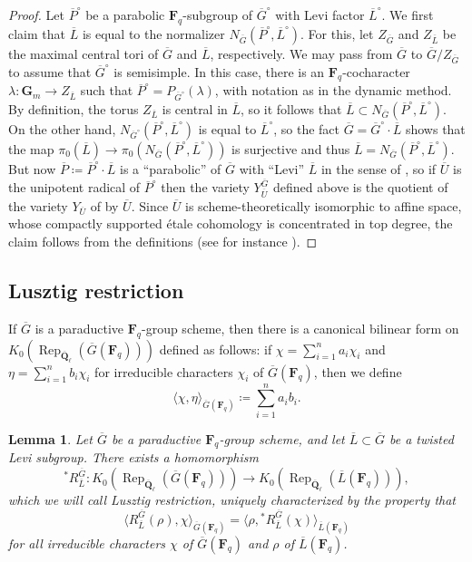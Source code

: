 \documentclass[reqno]{amsart}
\numberwithin{equation}{subsection}
\newcommand{\F}{\mathbf{F}}
\newcommand{\G}{\mathbf{G}}
\newcommand{\Q}{\mathbf{Q}}
\newcommand{\ol}[1]{\overline{#1}}
\newcommand{\co}{\colon}
\DeclareMathOperator{\Rep}{Rep}
\newtheorem{lemma}[thm]{Lemma}
\theoremstyle{remark}
\numberwithin{equation}{subsection}
\numberwithin{figure}{subsection}
\begin{document}
\begin{proof}
    Let $\ol P^\circ$ be a parabolic $\F_q$-subgroup of $\ol G^\circ$ with Levi factor $\ol L^\circ$. We first claim that $\ol L$ is equal to the normalizer $N_{\ol G}(\ol P^\circ, \ol L^\circ)$. For this, let $Z_{\ol G}$ and $Z_{\ol L}$ be the maximal central tori of $\ol G$ and $\ol L$, respectively. We may pass from $\ol G$ to $\ol G/Z_{\ol G}$ to assume that $\ol G^\circ$ is semisimple. In this case, there is an $\F_q$-cocharacter $\lambda\co \G_m \to Z_{\ol L}$ such that $\ol P^\circ = P_{\ol G^\circ}(\lambda)$, with notation as in the dynamic method. By definition, the torus $Z_{\ol L}$ is central in $\ol L$, so it follows that $\ol L \subset N_{\ol G}(\ol P^\circ, \ol L^\circ)$. On the other hand, $N_{\ol G^\circ}(\ol P^\circ, \ol L^\circ)$ is equal to $\ol L^\circ$, so the fact $\ol G = \ol G^\circ \cdot \ol L$ shows that the map $\pi_0(\ol L) \to \pi_0(N_{\ol G}(\ol P^\circ, \ol L^\circ))$ is surjective and thus $\ol L = N_{\ol G}(\ol P^\circ, \ol L^\circ)$. But now $\ol P \coloneqq \ol P^\circ \cdot \ol L$ is a ``parabolic'' of $\ol G$ with ``Levi'' $\ol L$ in the sense of \cite[D\'efinition 1.4]{DM94}, so if $\ol U$ is the unipotent radical of $\ol P^\circ$ then the variety $Y_{\ol U}^{\ol G}$ defined above is the quotient of the variety $Y_{\ol U}$ of \cite[D\'efinition 2.1]{DM94} by $\ol U$. Since $\ol U$ is scheme-theoretically isomorphic to affine space, whose compactly supported \'etale cohomology is concentrated in top degree, the claim follows from the definitions (see for instance \cite[Proposition 10.12]{DM20}).
\end{proof}



\subsection{Lusztig restriction}\label{ss:lusztig-restriction}

If $\ol G$ is a paraductive $\F_q$-group scheme, then there is a canonical bilinear form on $K_0(\Rep_{\ol\Q_\ell}(\ol G(\F_q)))$ defined as follows: if $\chi = \sum_{i=1}^n a_i\chi_i$ and $\eta = \sum_{i=1}^n b_i \chi_i$ for irreducible characters $\chi_i$ of $\ol G(\F_q)$, then we define
\[
\langle \chi, \eta\rangle_{\ol G(\F_q)} \coloneqq \sum_{i=1}^n a_ib_i.
\]

\begin{lemma}\label{lemma:dl-restriction}
    Let $\ol G$ be a paraductive $\F_q$-group scheme, and let $\ol L \subset \ol G$ be a twisted Levi subgroup. There exists a homomorphism
    \[
    ^*R^{\ol G}_{\ol L}\co K_0(\Rep_{\ol\Q_\ell}(\ol G(\F_q))) \to K_0(\Rep_{\ol\Q_\ell}(\ol L(\F_q))),
    \]
    which we will call \textit{Lusztig restriction}, uniquely characterized by the property that
    \begin{equation}\label{eqn:dl-restriction-adjoint}
    \langle R_{\ol L}^{\ol G}(\rho), \chi\rangle_{\ol G(\F_q)} = \langle \rho, {}^*R^{\ol G}_{\ol L}(\chi)\rangle_{\ol L(\F_q)}
    \end{equation}
    for all irreducible characters $\chi$ of $\ol G(\F_q)$ and $\rho$ of $\ol L(\F_q)$.
\end{lemma}
\end{document}
